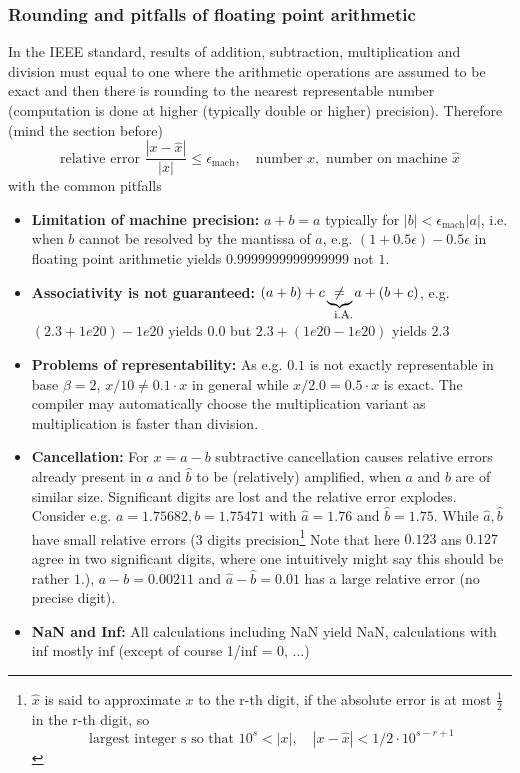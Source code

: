 \subsubsection{Rounding and pitfalls of floating point arithmetic}
In the IEEE standard, results of addition, subtraction, multiplication and division must equal to
one where the arithmetic operations are assumed to be exact and then there is rounding to the nearest
representable number (computation is done at higher (typically double or higher) precision). Therefore (mind the section before)
\begin{equation}
    \text{relative error } \frac{|x-\hat{x}|}{|x|} \leq \epsilon_{\text{mach}}, \quad \text{number } x, \text{ number on machine } \hat{x}
\end{equation}
with the common pitfalls
\begin{itemize}
    \item \textcolor{red1}{\textbf{Limitation of machine precision:}} $a+b=a$ typically for $|b| < \epsilon_{\text{mach}} |a|$, i.e. when $b$ cannot be resolved by the mantissa of $a$, e.g. $(1+0.5\epsilon) - 0.5\epsilon$ in floating point arithmetic yields $0.9999999999999999$ not $1$.
    \item \textcolor{red1}{\textbf{Associativity is not guaranteed:}} $(a+b)+c \explain{\ne}{i.A.} a+(b+c)$, e.g. $(2.3 + 1e20) - 1e20$ yields $0.0$ but $2.3 + (1e20 - 1e20)$ yields $2.3$
    \item \textcolor{red1}{\textbf{Problems of representability:}} As e.g. $0.1$ is not exactly representable in base $\beta = 2$, $x/10 \ne 0.1 \cdot x$ in general while $x/2.0 = 0.5 \cdot x$ is exact. The compiler may automatically choose the multiplication variant as multiplication is faster than division.
    \item \textcolor{red1}{\textbf{Cancellation:}} For $x = a - b$ subtractive cancellation causes relative errors already present in $\hat{a}$ and $\hat{b}$ to be (relatively) amplified, when $a$ and $b$ are of similar size. Significant digits are lost and the relative error explodes. Consider e.g. $a = 1.75682, b = 1.75471$ with $\hat{a} = 1.76$ and $\hat{b} = 1.75$. While $\hat{a},\hat{b}$ have small relative errors (3 digits precision\footnote{$\hat{x}$ is said to approximate $x$ to the r-th digit, if the absolute error is at most $\frac{1}{2}$ in the r-th digit, so 
    \begin{equation} \text{largest integer s so that } 10^s < |x|, \quad |x-\hat{x}| < 1/2 \cdot 10^{s-r+1} \end{equation}} Note that here $0.123$ ans $0.127$ agree in two significant digits, where one intuitively might say this should be rather $1$.), $a-b = 0.00211$ and $\hat{a} - \hat{b} = 0.01$ has a large relative error (no precise digit).
    \item \textcolor{red1}{\textbf{NaN and Inf:}} All calculations including NaN yield NaN, calculations with inf mostly inf (except of course 1/inf = 0, ...)
\end{itemize}
